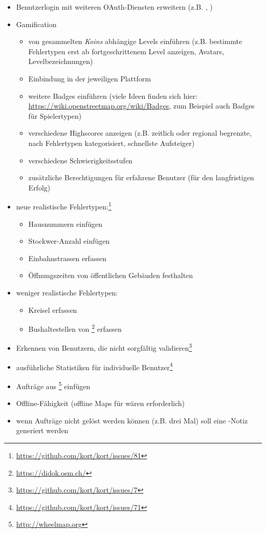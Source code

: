 \begin{itemize}
	\item Benutzerlogin mit weiteren \gls{OAuth}-Diensten erweitern (z.B. , )
	\item \gls{Gamification}
	\begin{itemize}
		\item von gesammelten \emph{Koins} abhängige Levels einführen (z.B. bestimmte Fehlertypen erst ab fortgeschrittenem Level anzeigen, Avatars, Levelbezeichnungen)
		\item Einbindung in  der jeweiligen Plattform
		\item weitere Badges einführen (viele Ideen finden sich hier: \url{https://wiki.openstreetmap.org/wiki/Badges}, zum Beispiel auch Badges für Spielertypen)
		\item verschiedene Highscores anzeigen (z.B. zeitlich oder regional begrenzte, nach Fehlertypen kategorisiert, schnellste Aufsteiger)
		\item verschiedene Schwierigkeitsstufen
		\item zusätzliche Berechtigungen für erfahrene Benutzer (für den langfristigen Erfolg)
	\end{itemize}
	\item neue realistische Fehlertypen:\footnote{\url{https://github.com/kort/kort/issues/81}}
	\begin{itemize}
		\item Hausnummern einfügen
		\item Stockwer-Anzahl einfügen
		\item Einbahnstrassen erfassen
		\item Öffnungszeiten von öffentlichen Gebäuden festhalten
	\end{itemize}
	\item weniger realistische Fehlertypen:
		\begin{itemize}
			\item Kreisel erfassen
			\item Bushaltestellen von \footnote{\url{https://didok.osm.ch/}} erfassen
		\end{itemize}
	\item Erkennen von Benutzern, die nicht sorgfältig validieren\footnote{\url{https://github.com/kort/kort/issues/7}}
	\item ausführliche Statistiken für individuelle Benutzer\footnote{\url{https://github.com/kort/kort/issues/71}}
	\item Aufträge aus \footnote{\url{http://wheelmap.org}}	einfügen
	\item Offline-Fähigkeit (offline Maps für  wären erforderlich)
	\item wenn Aufträge nicht gelöst werden können (z.B. drei Mal) soll eine -Notiz generiert werden
\end{itemize}

